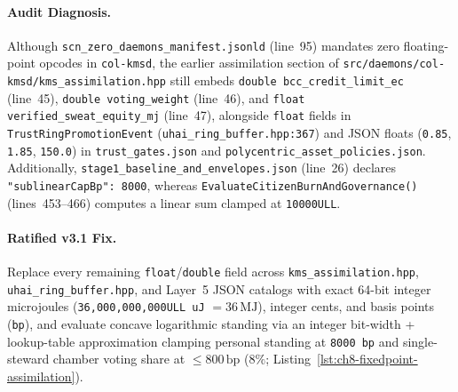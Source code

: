 \paragraph{Audit Diagnosis.}
Although \texttt{scn\_zero\_daemons\_manifest.jsonld} (line~95) mandates zero floating-point
opcodes in \texttt{col-kmsd}, the earlier assimilation section of
\texttt{src/daemons/col-kmsd/kms\_assimilation.hpp} still embeds \texttt{double
bcc\_credit\_limit\_ec} (line~45), \texttt{double voting\_weight} (line~46), and \texttt{float
verified\_sweat\_equity\_mj} (line~47), alongside \texttt{float} fields in
\texttt{TrustRingPromotionEvent} (\texttt{uhai\_ring\_buffer.hpp:367}) and JSON floats
(\texttt{0.85}, \texttt{1.85}, \texttt{150.0}) in \texttt{trust\_gates.json} and
\texttt{polycentric\_asset\_policies.json}. Additionally, \texttt{stage1\_baseline\_and\_envelopes.json}
(line~26) declares \texttt{"sublinearCapBp": 8000}, whereas
\texttt{EvaluateCitizenBurnAndGovernance()} (lines~453--466) computes a linear sum clamped at
\texttt{10000ULL}.

\paragraph{Ratified v3.1 Fix.}
Replace every remaining \texttt{float}/\texttt{double} field across \texttt{kms\_assimilation.hpp},
\texttt{uhai\_ring\_buffer.hpp}, and Layer~5 JSON catalogs with exact 64-bit integer
microjoules (\texttt{36,000,000,000ULL uJ} $= 36\,\mathrm{MJ}$), integer cents, and basis points
(\texttt{bp}), and evaluate concave logarithmic standing via an integer bit-width + lookup-table
approximation clamping personal standing at \texttt{8000 bp} and single-steward chamber voting
share at $\le 800\,\mathrm{bp}$ ($8\%$; Listing~\ref{lst:ch8-fixedpoint-assimilation}).

